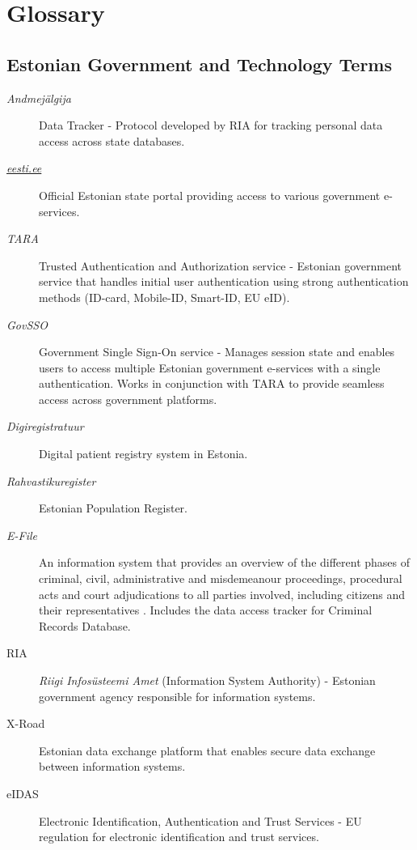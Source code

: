 \section{Glossary}

\subsection{Estonian Government and Technology Terms}

\begin{description}
    \item[\textit{Andmejälgija}] Data Tracker - Protocol developed by RIA for tracking personal data access across state databases.
    
    \item[\textit{\href{https://www.eesti.ee}{eesti.ee}}] Official Estonian state portal providing access to various government e-services.
    
    \item[\textit{TARA}] Trusted Authentication and Authorization service - Estonian government service that handles initial user authentication using strong authentication methods (ID-card, Mobile-ID, Smart-ID, EU eID).
    
    \item[\textit{GovSSO}] Government Single Sign-On service - Manages session state and enables users to access multiple Estonian government e-services with a single authentication. Works in conjunction with TARA to provide seamless access across government platforms.
    
    \item[\textit{Digiregistratuur}] Digital patient registry system in Estonia.
    
    \item[\textit{Rahvastikuregister}] Estonian Population Register.
    
    \item[\textit{E-File}] An information system that provides an overview of the different phases of criminal, civil, administrative and misdemeanour proceedings, procedural acts and court adjudications to all parties involved, including citizens and their representatives \cite{e-file-rik}. Includes the data access tracker for Criminal Records Database.
    
    \item[RIA] \textit{Riigi Infosüsteemi Amet} (Information System Authority) - Estonian government agency responsible for information systems.
    
    \item[X-Road] Estonian data exchange platform that enables secure data exchange between information systems.
    
    \item[eIDAS] Electronic Identification, Authentication and Trust Services - EU regulation for electronic identification and trust services.
\end{description}

